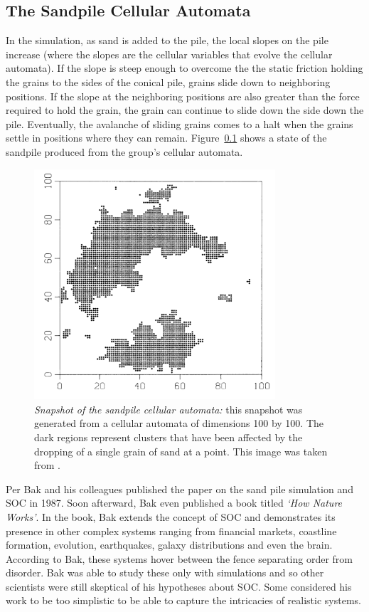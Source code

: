 \documentclass{book}
\begin{document}
\subsection{The Sandpile Cellular Automata}
In the simulation, as sand is added to the pile, the local slopes on the pile increase (where the slopes are the cellular variables that evolve the cellular automata). If the slope is steep enough to overcome the the static friction holding the grains to the sides of the conical pile, grains slide down to neighboring positions. If the slope at the neighboring positions are also greater than the force required to hold the grain,  the grain can continue to slide down the side down the pile. Eventually, the avalanche of sliding grains comes to a halt when the grains settle in positions where they can remain. Figure~\ref{} shows a state of the sandpile produced from the group's cellular automata. 
\begin{figure}[h]
	\centering
	\includegraphics[width=0.8\textwidth]{Figures/Intro/SandPileFigs/perBak_cellular}
	\caption[Snapshot of the sandpile cellular automata]{\textit{Snapshot of the sandpile cellular automata:} this snapshot was generated from a cellular automata of dimensions 100 by 100. The dark regions represent clusters that have been affected by the dropping of a single grain of sand at a point.  This image was taken from \cite{IMGCriticalPoint}. }
	\label{fig:perBak_cellular}
\end{figure}
Per Bak and his colleagues published the paper on the sand pile simulation and SOC in 1987. Soon afterward, Bak even published a book titled \textit{`How Nature Works'}. In the book, Bak extends the concept of SOC and demonstrates its presence in other complex systems ranging from financial markets,  coastline formation, evolution, earthquakes, galaxy distributions and even the brain. According to Bak, these systems hover between the fence separating order from disorder. Bak was able to study these only with simulations and so other scientists were still skeptical of his hypotheses about SOC. Some considered his work to be too simplistic to be able to capture the intricacies of realistic systems. 
\end{document}
